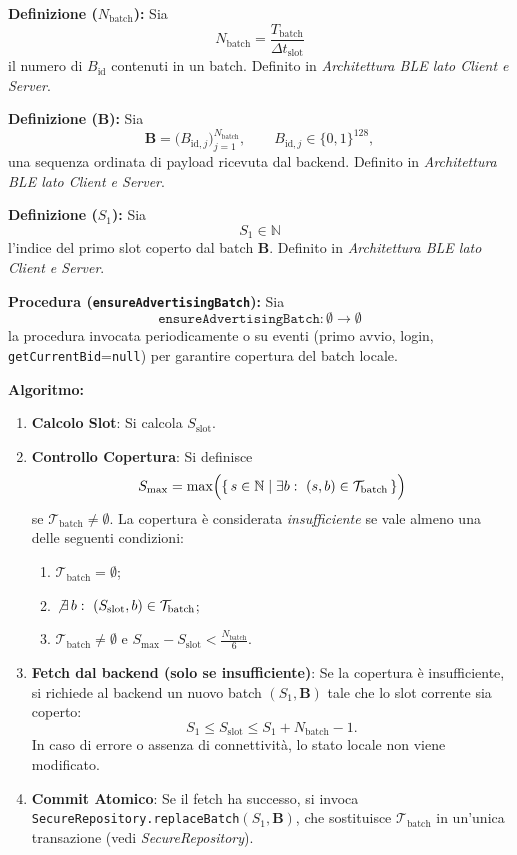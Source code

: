 \documentclass[a4paper,11pt,table,dvipsnames]{article}
\begin{document}
\textbf{Definizione (\(N_{\text{batch}}\)):}
Sia
\[
    N_{\text{batch}} = \frac{T_{\text{batch}}}{\Delta t_{\text{slot}}}
\]
il numero di \(B_{\text{id}}\) contenuti in un batch.
Definito in \emph{Architettura BLE lato Client e Server}.

\textbf{Definizione (\(\mathbf{B}\)):}
Sia
\[
    \mathbf{B}
    = \bigl(B_{\text{id},j}\bigr)_{j=1}^{N_{\text{batch}}},
    \qquad B_{\text{id},j} \in \{0,1\}^{128},
\]
una sequenza ordinata di payload ricevuta dal backend.
Definito in \emph{Architettura BLE lato Client e Server}.

\textbf{Definizione (\(S_1\)):}
Sia
\[
    S_1 \in \mathbb{N}
\]
l’indice del primo slot coperto dal batch \(\mathbf{B}\).
Definito in \emph{Architettura BLE lato Client e Server}.

\textbf{Procedura (\texttt{ensureAdvertisingBatch}):}
Sia
\[
    \texttt{ensureAdvertisingBatch}: \emptyset \rightarrow \emptyset
\]
la procedura invocata periodicamente o su eventi (primo avvio, login, \texttt{getCurrentBid}=\texttt{null}) per garantire copertura del batch locale.

\textbf{Algoritmo:}
\begin{enumerate}
    \item \textbf{Calcolo Slot}:
          Si calcola \(S_{\text{slot}}\).

    \item \textbf{Controllo Copertura}:
          Si definisce
          \[
              S_{\max} =
              \max\Bigl(\{\, s \in \mathbb{N} \mid \exists b:\ (s,b)\in\mathcal{T}_{\text{batch}} \,\}\Bigr)
          \]
          se \(\mathcal{T}_{\text{batch}}\neq \emptyset\).
          La copertura è considerata \emph{insufficiente} se vale almeno una delle seguenti condizioni:
          \begin{enumerate}[label=(\alph*), nosep]
              \item \(\mathcal{T}_{\text{batch}} = \emptyset\);
              \item \(\not\exists\, b:\ (S_{\text{slot}},b)\in\mathcal{T}_{\text{batch}}\);
              \item \(\mathcal{T}_{\text{batch}}\neq \emptyset\) e \(S_{\max} - S_{\text{slot}} < \frac{N_{\text{batch}}}{6}\).
          \end{enumerate}

    \item \textbf{Fetch dal backend (solo se insufficiente)}:
          Se la copertura è insufficiente, si richiede al backend un nuovo batch \((S_1,\mathbf{B})\) tale che lo slot corrente sia coperto:
          \[
              S_1 \le S_{\text{slot}} \le S_1 + N_{\text{batch}} - 1.
          \]
          In caso di errore o assenza di connettività, lo stato locale non viene modificato.

    \item \textbf{Commit Atomico}:
          Se il fetch ha successo, si invoca \texttt{SecureRepository.replaceBatch}\((S_1,\mathbf{B})\), che sostituisce \(\mathcal{T}_{\text{batch}}\) in un’unica transazione (vedi \emph{SecureRepository}).
\end{enumerate}
\end{document}
